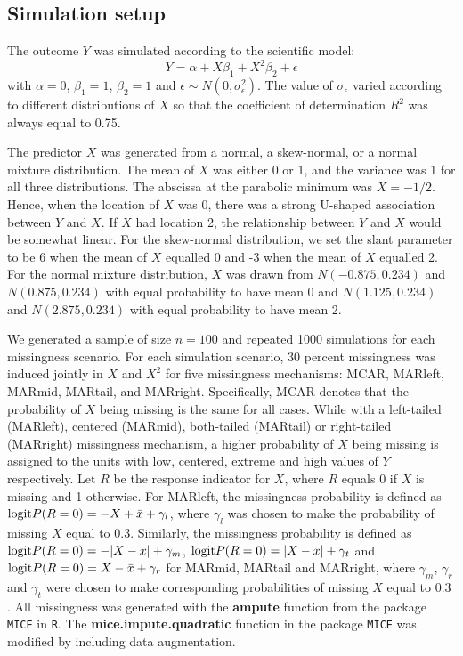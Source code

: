 	\subsection{Simulation setup}
	The outcome $Y$ was simulated according to the scientific model:
	\begin{equation}
		Y = \alpha + X\beta_{1} + X^2\beta_{2} +\epsilon
	\end{equation}
	with $\alpha = 0$, $\beta_{1} = 1$, $\beta_{2} = 1$ and  $\epsilon \sim N(0, \sigma_{\epsilon}^2)$. The value of $\sigma_{\epsilon}$ varied according to different distributions of $X$ so that the coefficient of determination $R^2$ was always equal to 0.75. 
	
	The predictor $X$ was generated from a normal, a skew-normal, or a normal mixture distribution. The mean of $X$ was either 0 or 1, and the variance was 1 for all three distributions. The abscissa at the parabolic minimum was $X = -1/2$. Hence, when the location of $X$ was 0, there was a strong U-shaped association between $Y$ and $X$. If $X$ had location 2, the relationship between $Y$ and $X$ would be somewhat linear. For the skew-normal distribution, we set the slant parameter to be 6 when the mean of $X$ equalled 0 and -3 when the mean of $X$ equalled 2. For the normal mixture distribution, $X$ was drawn from $N(-0.875, 0.234)$ and $N(0.875, 0.234)$ with equal probability to have mean 0 and $N(1.125, 0.234)$ and $N(2.875, 0.234)$ with equal probability to have mean 2. 
	
	We generated a sample of size $n = 100$ and repeated 1000 simulations for each missingness scenario. For each simulation scenario, 30 percent missingness was induced jointly in $X$ and $X^2$ for five missingness mechanisms: MCAR, MARleft, MARmid, MARtail, and MARright. Specifically, MCAR denotes that the probability of $X$ being missing is the same for all cases. While with a left-tailed (MARleft), centered (MARmid), both-tailed (MARtail) or right-tailed (MARright) missingness mechanism, a higher probability of $X$ being missing is assigned to the units with low, centered, extreme and high values of $Y$ respectively. Let $R$ be the response indicator for $X$, where $R$ equals 0 if $X$ is missing and 1 otherwise. For MARleft, the missingness probability is defined as $\textnormal{logit} P(R = 0) = -X + \bar{x} + \gamma_{l}$, where $\gamma_{l}$ was chosen to make the probability of missing $X$ equal to 0.3. Similarly, the missingness probability is defined as $\textnormal{logit} P(R = 0) = -|X - \bar{x}| + \gamma_{m}$, $\textnormal{logit} P(R = 0) = |X - \bar{x}| + \gamma_{t}$ and $\textnormal{logit} P(R = 0) = X - \bar{x} + \gamma_{r}$ for MARmid, MARtail and MARright, where $\gamma_{m}$, $\gamma_{r}$ and $\gamma_{t}$ were chosen to make corresponding probabilities of missing $X$ equal to 0.3 \citep[Section 3.2.4]{Buuren2018}. All missingness was generated with the \textbf{ampute} function \citep{Schouten2018} from the package \texttt{MICE} \citep{Buuren2011} in \texttt{R}. The \textbf{mice.impute.quadratic} function in the package \texttt{MICE} was modified by including data augmentation.
